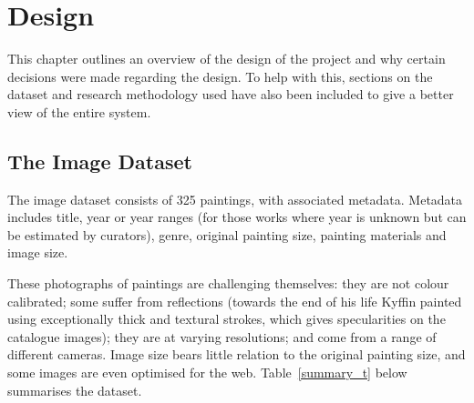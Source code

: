 \chapter{Design}

This chapter outlines an overview of the design of the project and why certain decisions were made
regarding the design. To help with this, sections on the dataset and research methodology used
have also been included to give a better view of the entire system.






\section{The Image Dataset}
The image dataset consists of 325 paintings, with associated metadata. Metadata
includes title, year or year ranges (for those works where year is unknown but
can be estimated by curators), genre, original painting size, painting
materials and image size.

These photographs of paintings are challenging themselves: they are
not colour calibrated; some suffer from reflections (towards the end of his
life Kyffin painted using exceptionally thick and textural strokes, which gives
specularities on the catalogue images); they are at varying resolutions; and
come from a range of different cameras. Image size bears little relation to the
original painting size, and some images are even optimised for the web.
Table~\ref{summary_t} below summarises the dataset.

